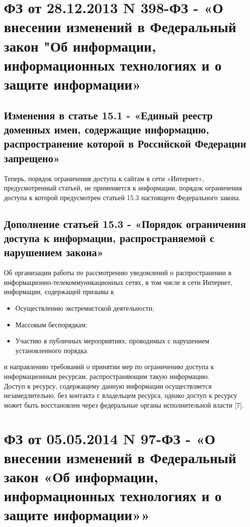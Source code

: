 \documentclass[14pt,a4paper,report]{article}
\begin{document}
\section{ФЗ от 28.12.2013 N 398-ФЗ - «О внесении изменений в Федеральный закон "Об информации, информационных технологиях и о защите информации»}

\subsection{Изменения в статье 15.1 - «Единый реестр доменных имен, содержащие информацию, распространение которой в Российской Федерации запрещено»}

Теперь, порядок ограничения доступа к сайтам в сети «Интернет«, предусмотренный статьей, не применяется к информации, порядок ограничения доступа к которой предусмотрен статьей 15.3 настоящего Федерального закона.

\subsection{Дополнение статьей 15.3 - «Порядок ограничения доступа к информации, распространяемой с нарушением закона»}

Об организации работы по рассмотрению уведомлений о распространении в информационно-телекоммуникационных сетях, в том числе в сети Интернет, информации, содержащей призывы к \begin{itemize}
	\item Осуществлению экстремистской деятельности;
	\item Массовым беспорядкам;
	\item Участию в публичных мероприятиях, проводимых с нарушением установленного порядка.
\end{itemize}
и направлению требований о принятии мер по ограничению доступа к информационным ресурсам, распространяющим такую информацию.\\

Доступ к ресурсу, содержащему данную информации осуществляется незамедлительно, без контакта с владельцем ресурса, однако доступ к ресурсу может быть восстановлен через федеральные органы исполнительной власти [7].


\section{ФЗ от 05.05.2014 N 97-ФЗ - «О внесении изменений в Федеральный закон «Об информации, информационных технологиях и о защите информации»»}
\end{document}
